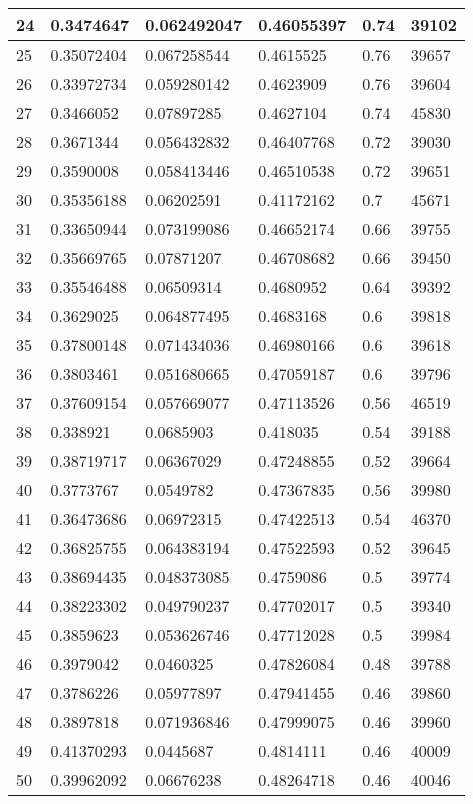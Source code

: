 \begin{longtable}{|l|l|l|l|l|l|}
24 & 0.3474647 & 0.062492047 & 0.46055397 & 0.74 & 39102 \\ \hline 
25 & 0.35072404 & 0.067258544 & 0.4615525 & 0.76 & 39657 \\ \hline 
26 & 0.33972734 & 0.059280142 & 0.4623909 & 0.76 & 39604 \\ \hline 
27 & 0.3466052 & 0.07897285 & 0.4627104 & 0.74 & 45830 \\ \hline 
28 & 0.3671344 & 0.056432832 & 0.46407768 & 0.72 & 39030 \\ \hline 
29 & 0.3590008 & 0.058413446 & 0.46510538 & 0.72 & 39651 \\ \hline 
30 & 0.35356188 & 0.06202591 & 0.41172162 & 0.7 & 45671 \\ \hline 
31 & 0.33650944 & 0.073199086 & 0.46652174 & 0.66 & 39755 \\ \hline 
32 & 0.35669765 & 0.07871207 & 0.46708682 & 0.66 & 39450 \\ \hline 
33 & 0.35546488 & 0.06509314 & 0.4680952 & 0.64 & 39392 \\ \hline 
34 & 0.3629025 & 0.064877495 & 0.4683168 & 0.6 & 39818 \\ \hline 
35 & 0.37800148 & 0.071434036 & 0.46980166 & 0.6 & 39618 \\ \hline 
36 & 0.3803461 & 0.051680665 & 0.47059187 & 0.6 & 39796 \\ \hline 
37 & 0.37609154 & 0.057669077 & 0.47113526 & 0.56 & 46519 \\ \hline 
38 & 0.338921 & 0.0685903 & 0.418035 & 0.54 & 39188 \\ \hline 
39 & 0.38719717 & 0.06367029 & 0.47248855 & 0.52 & 39664 \\ \hline 
40 & 0.3773767 & 0.0549782 & 0.47367835 & 0.56 & 39980 \\ \hline 
41 & 0.36473686 & 0.06972315 & 0.47422513 & 0.54 & 46370 \\ \hline 
42 & 0.36825755 & 0.064383194 & 0.47522593 & 0.52 & 39645 \\ \hline 
43 & 0.38694435 & 0.048373085 & 0.4759086 & 0.5 & 39774 \\ \hline 
44 & 0.38223302 & 0.049790237 & 0.47702017 & 0.5 & 39340 \\ \hline 
45 & 0.3859623 & 0.053626746 & 0.47712028 & 0.5 & 39984 \\ \hline 
46 & 0.3979042 & 0.0460325 & 0.47826084 & 0.48 & 39788 \\ \hline 
47 & 0.3786226 & 0.05977897 & 0.47941455 & 0.46 & 39860 \\ \hline 
48 & 0.3897818 & 0.071936846 & 0.47999075 & 0.46 & 39960 \\ \hline 
49 & 0.41370293 & 0.0445687 & 0.4814111 & 0.46 & 40009 \\ \hline 
50 & 0.39962092 & 0.06676238 & 0.48264718 & 0.46 & 40046 \\ \hline 
\end{longtable}